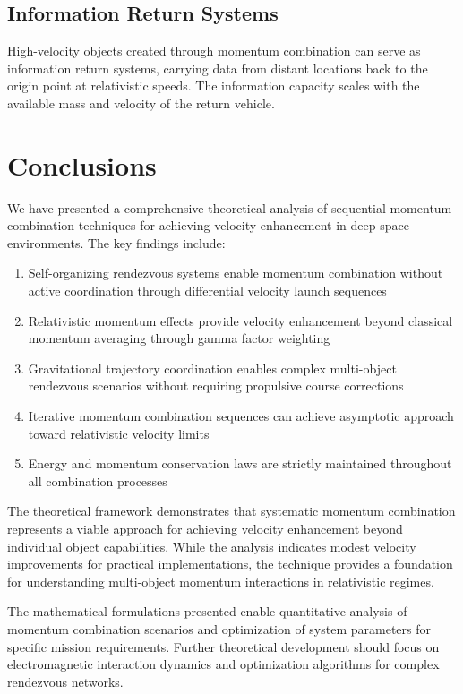 \documentclass[11pt,a4paper]{article}
\theoremstyle{remark}
\begin{document}
\subsection{Information Return Systems}

High-velocity objects created through momentum combination can serve as information return systems, carrying data from distant locations back to the origin point at relativistic speeds. The information capacity scales with the available mass and velocity of the return vehicle.

\section{Conclusions}

We have presented a comprehensive theoretical analysis of sequential momentum combination techniques for achieving velocity enhancement in deep space environments. The key findings include:

\begin{enumerate}
\item Self-organizing rendezvous systems enable momentum combination without active coordination through differential velocity launch sequences
\item Relativistic momentum effects provide velocity enhancement beyond classical momentum averaging through gamma factor weighting
\item Gravitational trajectory coordination enables complex multi-object rendezvous scenarios without requiring propulsive course corrections
\item Iterative momentum combination sequences can achieve asymptotic approach toward relativistic velocity limits
\item Energy and momentum conservation laws are strictly maintained throughout all combination processes
\end{enumerate}

The theoretical framework demonstrates that systematic momentum combination represents a viable approach for achieving velocity enhancement beyond individual object capabilities. While the analysis indicates modest velocity improvements for practical implementations, the technique provides a foundation for understanding multi-object momentum interactions in relativistic regimes.

The mathematical formulations presented enable quantitative analysis of momentum combination scenarios and optimization of system parameters for specific mission requirements. Further theoretical development should focus on electromagnetic interaction dynamics and optimization algorithms for complex rendezvous networks.
\end{document}
